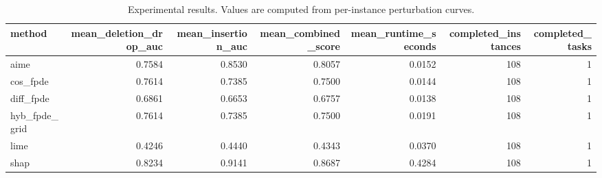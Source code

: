 \begin{table}[t]
\caption{Experimental results. Values are computed from per-instance perturbation curves.}
\label{tab:main_results_computed}
\centering
\begin{tabular}{lrrrrrr}
\toprule
method & mean\_deletion\_drop\_auc & mean\_insertion\_auc & mean\_combined\_score & mean\_runtime\_seconds & completed\_instances & completed\_tasks \\
\midrule
aime & 0.7584 & 0.8530 & 0.8057 & 0.0152 & 108 & 1 \\
cos\_fpde & 0.7614 & 0.7385 & 0.7500 & 0.0144 & 108 & 1 \\
diff\_fpde & 0.6861 & 0.6653 & 0.6757 & 0.0138 & 108 & 1 \\
hyb\_fpde\_grid & 0.7614 & 0.7385 & 0.7500 & 0.0191 & 108 & 1 \\
lime & 0.4246 & 0.4440 & 0.4343 & 0.0370 & 108 & 1 \\
shap & 0.8234 & 0.9141 & 0.8687 & 0.4284 & 108 & 1 \\
\bottomrule
\end{tabular}

\end{table}
